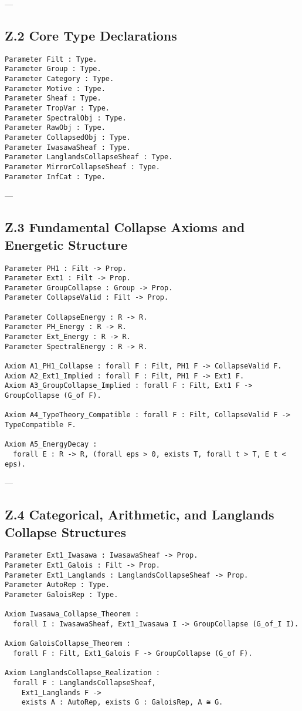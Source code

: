\documentclass[11pt]{article}
\begin{document}
---

\subsection*{Z.2 Core Type Declarations}

\begin{lstlisting}[language=Coq]
Parameter Filt : Type.
Parameter Group : Type.
Parameter Category : Type.
Parameter Motive : Type.
Parameter Sheaf : Type.
Parameter TropVar : Type.
Parameter SpectralObj : Type.
Parameter RawObj : Type.
Parameter CollapsedObj : Type.
Parameter IwasawaSheaf : Type.
Parameter LanglandsCollapseSheaf : Type.
Parameter MirrorCollapseSheaf : Type.
Parameter InfCat : Type.
\end{lstlisting}

---

\subsection*{Z.3 Fundamental Collapse Axioms and Energetic Structure}

\begin{lstlisting}[language=Coq]
Parameter PH1 : Filt -> Prop.
Parameter Ext1 : Filt -> Prop.
Parameter GroupCollapse : Group -> Prop.
Parameter CollapseValid : Filt -> Prop.

Parameter CollapseEnergy : R -> R.
Parameter PH_Energy : R -> R.
Parameter Ext_Energy : R -> R.
Parameter SpectralEnergy : R -> R.

Axiom A1_PH1_Collapse : forall F : Filt, PH1 F -> CollapseValid F.
Axiom A2_Ext1_Implied : forall F : Filt, PH1 F -> Ext1 F.
Axiom A3_GroupCollapse_Implied : forall F : Filt, Ext1 F -> GroupCollapse (G_of F).

Axiom A4_TypeTheory_Compatible : forall F : Filt, CollapseValid F -> TypeCompatible F.

Axiom A5_EnergyDecay :
  forall E : R -> R, (forall eps > 0, exists T, forall t > T, E t < eps).
\end{lstlisting}

---

\subsection*{Z.4 Categorical, Arithmetic, and Langlands Collapse Structures}

\begin{lstlisting}[language=Coq]
Parameter Ext1_Iwasawa : IwasawaSheaf -> Prop.
Parameter Ext1_Galois : Filt -> Prop.
Parameter Ext1_Langlands : LanglandsCollapseSheaf -> Prop.
Parameter AutoRep : Type.
Parameter GaloisRep : Type.

Axiom Iwasawa_Collapse_Theorem :
  forall I : IwasawaSheaf, Ext1_Iwasawa I -> GroupCollapse (G_of_I I).

Axiom GaloisCollapse_Theorem :
  forall F : Filt, Ext1_Galois F -> GroupCollapse (G_of F).

Axiom LanglandsCollapse_Realization :
  forall F : LanglandsCollapseSheaf,
    Ext1_Langlands F ->
    exists A : AutoRep, exists G : GaloisRep, A ≅ G.
\end{lstlisting}
\end{document}
